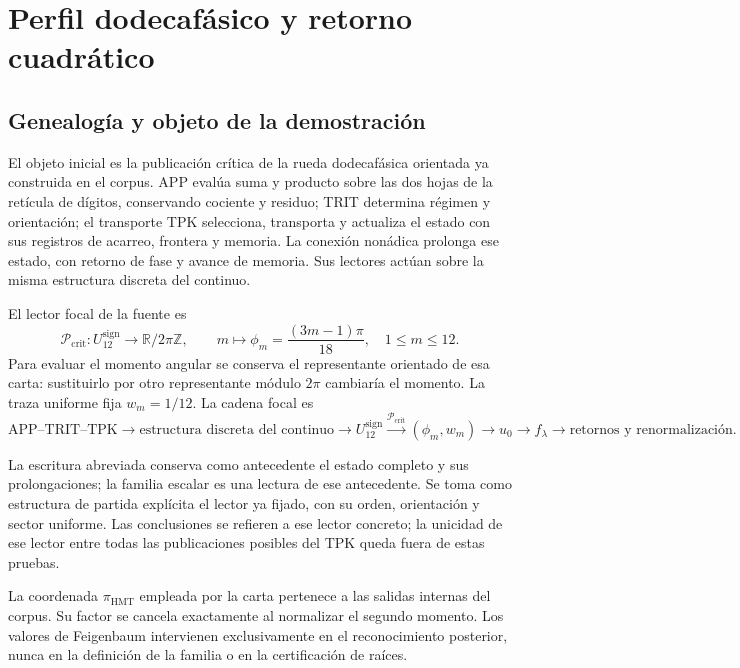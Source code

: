 \section{Perfil dodecafásico y retorno cuadrático}
\label{hmtfg:fragmento:perfil-dodecafasico-y-retorno-cuadratico}

\subsection{Genealogía y objeto de la demostración}
\label{hmtfg:desarrollo:1}

El objeto inicial es la publicación crítica de la rueda dodecafásica orientada ya construida en el corpus. APP evalúa suma y producto sobre las dos hojas de la retícula de dígitos, conservando cociente y residuo; TRIT determina régimen y orientación; el transporte TPK selecciona, transporta y actualiza el estado con sus registros de acarreo, frontera y memoria. La conexión nonádica prolonga ese estado, con retorno de fase y avance de memoria. Sus lectores actúan sobre la misma estructura discreta del continuo.

El lector focal de la fuente es
\[
\mathcal P_{\mathrm{crit}}:U_{12}^{\mathrm{sign}}\longrightarrow
\mathbb R/2\pi\mathbb Z,\qquad
m\longmapsto\phi_m=\frac{(3m-1)\pi}{18},\quad 1\le m\le12.
\]
Para evaluar el momento angular se conserva el representante orientado de esa carta: sustituirlo por otro representante módulo \(2\pi\) cambiaría el momento. La traza uniforme fija \(w_m=1/12\). La cadena focal es
\[
\text{APP–TRIT–TPK}\longrightarrow
\text{estructura discreta del continuo}\longrightarrow U_{12}^{\mathrm{sign}}
\xrightarrow{\mathcal P_{\mathrm{crit}}}(\phi_m,w_m)
\longrightarrow u_0\longrightarrow f_\lambda
\longrightarrow\text{retornos y renormalización}.
\]

La escritura abreviada conserva como antecedente el estado completo y sus prolongaciones; la familia escalar es una lectura de ese antecedente. Se toma como estructura de partida explícita el lector ya fijado, con su orden, orientación y sector uniforme. Las conclusiones se refieren a ese lector concreto; la unicidad de ese lector entre todas las publicaciones posibles del TPK queda fuera de estas pruebas.

La coordenada \(\pi_{\mathrm{HMT}}\) empleada por la carta pertenece a las salidas internas del corpus. Su factor se cancela exactamente al normalizar el segundo momento. Los valores de Feigenbaum intervienen exclusivamente en el reconocimiento posterior, nunca en la definición de la familia o en la certificación de raíces.


